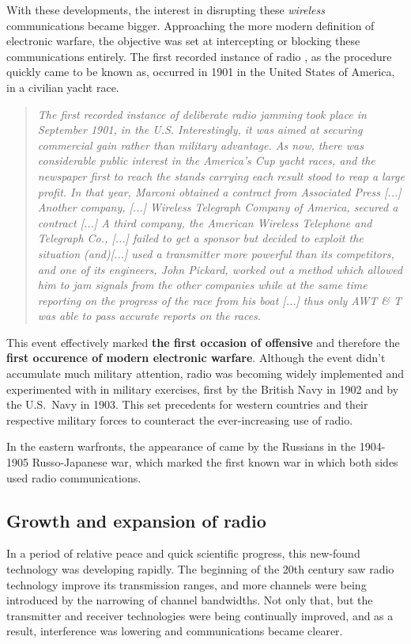 \documentclass[english,purist]{ist-report}
\begin{document}
With these developments, the interest in disrupting these \textit{wireless} communications became bigger. Approaching the more modern definition of electronic warfare, the objective was set at intercepting or blocking these communications entirely. The first recorded instance of radio \jamming{}, as the procedure quickly came to be known as, occurred in 1901 in the United States of America, in a civilian yacht race.
\begin{quote}\itshape
    The first recorded instance of deliberate radio jamming took place in
September 1901, in the U.S. Interestingly, it was aimed at securing
commercial gain rather than military advantage. As now, there was
considerable public interest in the America’s Cup yacht races, and the
newspaper first to reach the stands carrying each result stood to reap a
large profit. In that year, Marconi obtained a contract from Associated
Press [...] Another company, [...] Wireless Telegraph Company of America,
secured a contract [...] A third company, the American Wireless Telephone
and Telegraph Co., [...] failed to get a sponsor but decided to exploit the
situation (and)[...] used a transmitter more powerful than its competitors,
and one of its engineers, John Pickard, worked out a method which
allowed him to jam signals from the other companies while at the same
time reporting on the progress of the race from his boat [...] thus only AWT
\& T was able to pass accurate reports on the races. \cite{alican2006}
\end{quote}
This event effectively marked \textbf{the first occasion of offensive \jamming{}} and therefore the \textbf{first occurence of modern electronic warfare}. Although the event didn't accumulate much military attention, radio \jamming{} was becoming widely implemented and experimented with in military exercises, first by the British Navy in 1902 and by the U.S.\ Navy in 1903. This set precedents for western countries and their respective military forces to counteract the ever-increasing use of radio.

In the eastern warfronts, the appearance of \jamming{} came by the Russians in the 1904-1905 Russo-Japanese war, which marked the first known war in which both sides used radio communications.

\subsection{Growth and expansion of radio}

In a period of relative peace and quick scientific progress, this new-found technology was developing rapidly. The beginning of the 20th century saw radio technology improve its transmission ranges, and more channels were being introduced by the narrowing of channel bandwidths. Not only that, but the transmitter and receiver technologies were being continually improved, and as a result, interference was lowering and communications became clearer.
\end{document}

